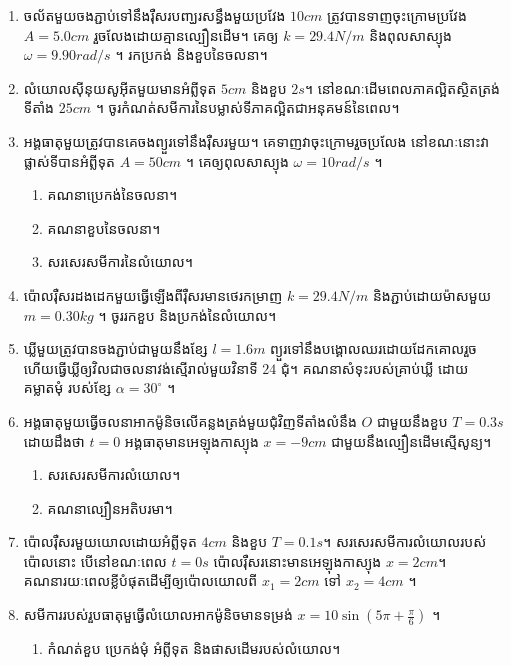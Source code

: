 \documentclass[12pt, a4paper]{article}
\begin{document}
\maketitle\koc
	\begin{enumerate}[m]
		\item ចល័តមួយចងភ្ជាប់ទៅនឹងរ៉ឺសរបញ្ឃរសន្ធឹងមួយប្រវែង $10cm$ ត្រូវបានទាញចុះក្រោមប្រវែង $A=5.0cm$ រួចលែងដោយគ្មានល្បឿនដើម។ គេឲ្យ $k=29.4N/m$ និងពុលសាស្យុង $\omega = 9.90rad/s$ ។ រកប្រកង់ និងខួបនៃចលនា។
		\item លំយោលសុីនុយសូអុីតមួយមានអំព្លីទុត $5cm$ និងខួប $2s$។ នៅខណៈដើមពេលភាគល្អិតស្ថិតត្រង់ទីតាំង $25cm$ ។ ចូរកំណត់សមីការនៃបម្លាស់ទីភាគល្អិតជាអនុគមន៍នៃពេល។
		\item អង្គធាតុមួយត្រូវបានគេចងព្យួរទៅនឹងរ៉ឺសរមួយ។ គេទាញវាចុះក្រោមរួចប្រលែង នៅខណៈនោះវាផ្លាស់ទីបានអំព្លីទុត $A=50cm$ ។ គេឲ្យពុលសាស្យុង $\omega=10rad/s$ ។
		\begin{enumerate}[k]
			\item គណនាប្រេកង់នៃចលនា។
			\item គណនាខួបនៃចលនា។
			\item សរសេរសមីការនៃលំយោល។
		\end{enumerate}
		\item ប៉ោលរ៉ឺសរដងដេកមួយធ្វើឡើងពីរ៉ឺសរមានថេរកម្រាញ $k=29.4N/m$ និងភ្ជាប់ដោយម៉ាសមួយ $m=0.30kg$ ។ ចូររកខួប និងប្រកង់នៃលំយោល។
		\item ឃ្លីមួយត្រូវបានចងភ្ជាប់ជាមួយនឹងខ្សែ $l=1.6m$ ព្យួរទៅនឹងបង្គោលឈរដោយដែកគោលរួចហើយធ្វើឃ្លីឲ្យវិលជាចលនាវង់ស្មើរាល់មួយវិនាទី $24$ ជុំ។ គណនាសំទុះរបស់គ្រាប់ឃ្លី ដោយគម្លាតមុំ របស់ខ្សែ $\alpha = 30^\circ$ ។
		\item អង្គធាតុមួយធ្វើចលនាអាកម៉ូនិចលើគន្លងត្រង់មួយជុំវិញទីតាំងលំនឹង $O$ ជាមួយនឹងខួប $T=0.3s$ ដោយដឹងថា $t=0$ អង្គធាតុមានអេឡុងកាស្យុង $x=-9cm$ ជាមួយនឹងល្បឿនដើមស្មើសូន្យ។
		\begin{enumerate}[k]
			\item សរសេរសមីការលំយោល។
			\item គណនាល្បឿនអតិបរមា។
		\end{enumerate}
		\item ប៉ោលរ៉ឺសរមួយយោលដោយអំព្លីទុត $4cm$ និងខួប $T=0.1s$។ សរសេរសមីការលំយោលរបស់ប៉ោលនោះ បើនៅខណៈពេល $t=0s$ ប៉ោលរ៉ឺសរនោះមានអេឡុង​​កា​​ស្យុង $x=2cm$។ គណនារយៈពេលខ្លីបំផុតដើម្បីឲ្យប៉ោលយោលពី $x_1=2cm$ ទៅ $x_2=4cm$ ។
		\item សមីការរបស់រួបធាតុមួធ្វើលំយោលអាកម៉ូនិចមានទម្រង់ $x=10\sin\left(5\pi + \frac{\pi}{6}\right)$ ។
		\begin{enumerate}[k]
			\item កំណត់ខួប ប្រេកង់មុំ អំព្លីទុត និងផាសដើមរបស់លំយោល។

\end{enumerate}
\end{enumerate}
\end{document}
